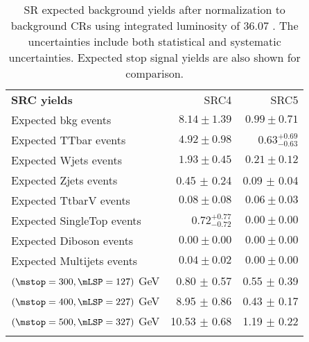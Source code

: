 

\begin{table}
\begin{center}
\setlength{\tabcolsep}{0.0pc}
{\small
\begin{tabular*}{\textwidth}{@{\extracolsep{\fill}}lrr}
\noalign{\smallskip}\hline\noalign{\smallskip}
{\bf SRC yields}           & SRC4            & SRC5              \\[-0.05cm]
\noalign{\smallskip}\hline\noalign{\smallskip}
Expected bkg events         & $8.14 \pm 1.39$          & $0.99 \pm 0.71$              \\
\noalign{\smallskip}\hline\noalign{\smallskip}
        Expected TTbar events         & $4.92 \pm 0.98$          & $0.63_{-0.63}^{+0.69}$              \\
        Expected Wjets events         & $1.93 \pm 0.45$          & $0.21 \pm 0.12$              \\
        Expected Zjets events         & 0.45 $\pm$ 0.24          & 0.09 $\pm$ 0.04             \\
        Expected TtbarV events         & $0.08 \pm 0.08$          & $0.06 \pm 0.03$              \\
        Expected SingleTop events         & $0.72_{-0.72}^{+0.77}$          & $0.00 \pm 0.00$              \\
        Expected Diboson events         & $0.00 \pm 0.00$          & $0.00 \pm 0.00$              \\
        Expected Multijets events         & $0.04 \pm 0.02$          & $0.00 \pm 0.00$              \\
 \noalign{\smallskip}\hline\noalign{\smallskip}
$(\mstop = 300, \mLSP = 127)$ GeV & 0.80 $\pm$ 0.57 &  0.55 $\pm$ 0.39 \\
$(\mstop = 400, \mLSP = 227)$ GeV & 8.95 $\pm$ 0.86 & 0.43 $\pm$ 0.17 \\
$(\mstop = 500, \mLSP = 327)$ GeV & 10.53 $\pm$ 0.68  & 1.19 $\pm$ 0.22 \\
 \noalign{\smallskip}\hline\noalign{\smallskip}
\end{tabular*}
}
\end{center}
\caption{SR expected background yields after normalization to background CRs using integrated luminosity of 36.07 \ifb. The uncertainties include both statistical and systematic uncertainties.  Expected stop signal yields are also shown for comparison.}
\label{table.bkgonly.SRC4to5}
\end{table}
%
